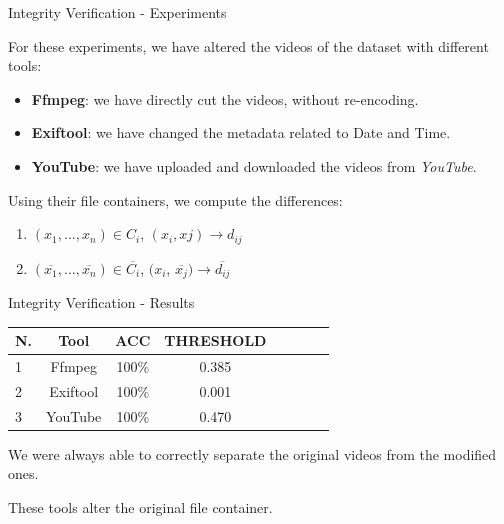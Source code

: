 \begin{tframe}{Integrity Verification - Experiments}

For these experiments, we have altered the videos of the dataset with different tools:

\begin{itemize}
\item \textbf{Ffmpeg}: we have directly cut the videos, without re-encoding.
\vspace{0.1cm}
\item \textbf{Exiftool}: we have changed the metadata related to Date and Time.
\vspace{0.1cm}
\item \textbf{YouTube}: we have uploaded and downloaded the videos from \emph{YouTube}.
\end{itemize}

\vspace{0.5cm}

Using their file containers, we compute the differences:

\begin{enumerate}

\item $(x_{1},\ldots,x_{n}) \in C_{i}$, $(x_{i}, x{j}) \rightarrow d_{ij}$
\vspace{0.1cm}
\item $(\overline{x_{1}},\ldots,\overline{x_{n}}) \in \overline{C_{i}}$, $(x_{i}$, $\overline{x_{j}}) \rightarrow \overline{d_{ij}}$ 

\end{enumerate}

\end{tframe}

\begin{tframe}{Integrity Verification - Results}

\begin{footnotesize}
\begin{table}[h!]
\centering
\begin{tabular}{l c c c c c c c} 
\hline \hline 
\textbf{N.} & \textbf{Tool} & \textbf{ACC} & \textbf{THRESHOLD}\\ [0.5ex]
\hline
1 & Ffmpeg & 100\% & 0.385\\
2 & Exiftool & 100\% &	0.001 \\
3 &	YouTube & 100\% & 0.470 \\ 

\hline
\end{tabular}
\end{table}
\end{footnotesize}

\vspace{0.2cm}
We were always able to correctly separate the original videos from the modified ones.

\vspace{0.5cm}
These tools alter the original file container.

\end{tframe}

